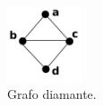  \begin{figure}[htb]	
 \center%
 \includegraphics[width=2.2cm]{./img/diamond.png}
 \caption{Grafo diamante.}
\label{fig:diamond}
\end{figure}  
 
